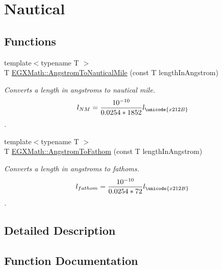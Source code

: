 \hypertarget{group___e_g_x_math-_conversions-_length_conversions-_non-_s_i-_angstrom-_nautical}{}\section{Nautical}
\label{group___e_g_x_math-_conversions-_length_conversions-_non-_s_i-_angstrom-_nautical}
\subsection*{Functions}
\begin{DoxyCompactItemize}
\item 
{\footnotesize template$<$typename T $>$ }\\T \mbox{\hyperlink{group___e_g_x_math-_conversions-_length_conversions-_non-_s_i-_angstrom-_nautical_ga4be465819cdcbfd7da046440844f5d82}{E\+G\+X\+Math\+::\+Angstrom\+To\+Nautical\+Mile}} (const T length\+In\+Angstrom)
\begin{DoxyCompactList}\small\item\em Converts a length in angstroms to nautical mile. \[ l_{NM}= \frac{10^{-10}}{0.0254 * 1852} l_{\unicode{x212B}} \]. \end{DoxyCompactList}\item 
{\footnotesize template$<$typename T $>$ }\\T \mbox{\hyperlink{group___e_g_x_math-_conversions-_length_conversions-_non-_s_i-_angstrom-_nautical_gab7a96e419622057d8fcce5af11ae0a9a}{E\+G\+X\+Math\+::\+Angstrom\+To\+Fathom}} (const T length\+In\+Angstrom)
\begin{DoxyCompactList}\small\item\em Converts a length in angstroms to fathoms. \[ l_{fathom}= \frac{10^{-10}}{0.0254 * 72} l_{\unicode{x212B}} \]. \end{DoxyCompactList}\end{DoxyCompactItemize}


\subsection{Detailed Description}


\subsection{Function Documentation}
\mbox{\label{group___e_g_x_math-_conversions-_length_conversions-_non-_s_i-_angstrom-_nautical_gab7a96e419622057d8fcce5af11ae0a9a}} 
